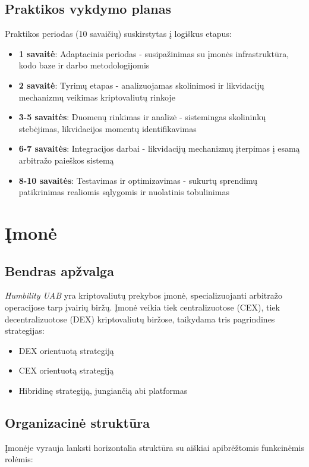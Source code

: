 \documentclass[]{VUMIFTemplateClass}
\begin{document}
\subsection*{Praktikos vykdymo planas}
Praktikos periodas (10 savaičių) suskirstytas į logiškus etapus:

\begin{itemize}
\item \textbf{1 savaitė}: Adaptacinis periodas - susipažinimas su įmonės infrastruktūra, kodo baze ir darbo metodologijomis

\item \textbf{2 savaitė}: Tyrimų etapas - analizuojamas skolinimosi ir likvidacijų mechanizmų veikimas kriptovaliutų rinkoje

\item \textbf{3-5 savaitės}: Duomenų rinkimas ir analizė - sistemingas skolininkų stebėjimas, likvidacijos momentų identifikavimas

\item \textbf{6-7 savaitės}: Integracijos darbai - likvidacijų mechanizmų įterpimas į esamą arbitražo paieškos sistemą

\item \textbf{8-10 savaitės}: Testavimas ir optimizavimas - sukurtų sprendimų patikrinimas realiomis sąlygomis ir nuolatinis tobulinimas
\end{itemize}

\section{Įmonė}

\subsection{Bendras apžvalga}
\textit{Humbility UAB} yra kriptovaliutų prekybos įmonė, specializuojanti arbitražo operacijose tarp įvairių biržų. Įmonė veikia tiek centralizuotose (CEX), tiek decentralizuotose (DEX) kriptovaliutų biržose, taikydama tris pagrindines strategijas:
\begin{itemize}
\item DEX orientuotą strategiją
\item CEX orientuotą strategiją
\item Hibridinę strategiją, jungiančią abi platformas
\end{itemize}

\subsection{Organizacinė struktūra}
Įmonėje vyrauja lanksti horizontalia struktūra su aiškiai apibrėžtomis funkcinėmis rolėmis:
\end{document}
